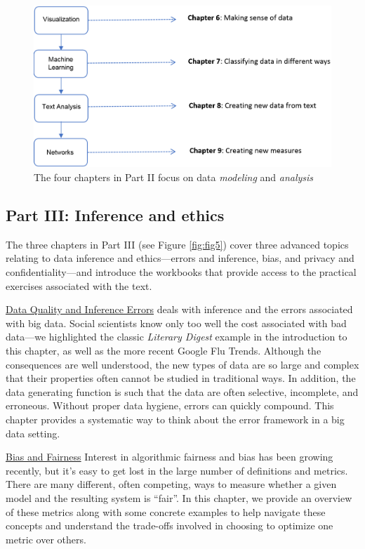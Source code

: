 \documentclass[]{krantz}
\begin{document}
\begin{figure}

{\centering \includegraphics[width=0.9\linewidth]{ChapterIntro/figures/Figure3_new} 

}

\caption{The four chapters in Part II focus on data \textit{modeling} and \textit{analysis}}\label{fig:fig4}
\end{figure}

\subsection{Part III: Inference and
ethics}\label{part-iii-inference-and-ethics}

The three chapters in Part III (see Figure \ref{fig:fig5}) cover three
advanced topics relating to data inference and ethics---errors and
inference, bias, and privacy and confidentiality---and introduce the
workbooks that provide access to the practical exercises associated with
the text.

\protect\hyperlink{chap:errors}{Data Quality and Inference Errors} deals
with inference and the errors associated with big data. Social
scientists know only too well the cost associated with bad data---we
highlighted the classic \emph{Literary Digest} example in the
introduction to this chapter, as well as the more recent Google Flu
Trends. Although the consequences are well understood, the new types of
data are so large and complex that their properties often cannot be
studied in traditional ways. In addition, the data generating function
is such that the data are often selective, incomplete, and erroneous.
Without proper data hygiene, errors can quickly compound. This chapter
provides a systematic way to think about the error framework in a big
data setting.

\protect\hyperlink{chap:bias}{Bias and Fairness} Interest in algorithmic
fairness and bias has been growing recently, but it's easy to get lost
in the large number of definitions and metrics. There are many
different, often competing, ways to measure whether a given model and
the resulting system is ``fair''. In this chapter, we provide an
overview of these metrics along with some concrete examples to help
navigate these concepts and understand the trade-offs involved in
choosing to optimize one metric over others.
\end{document}
